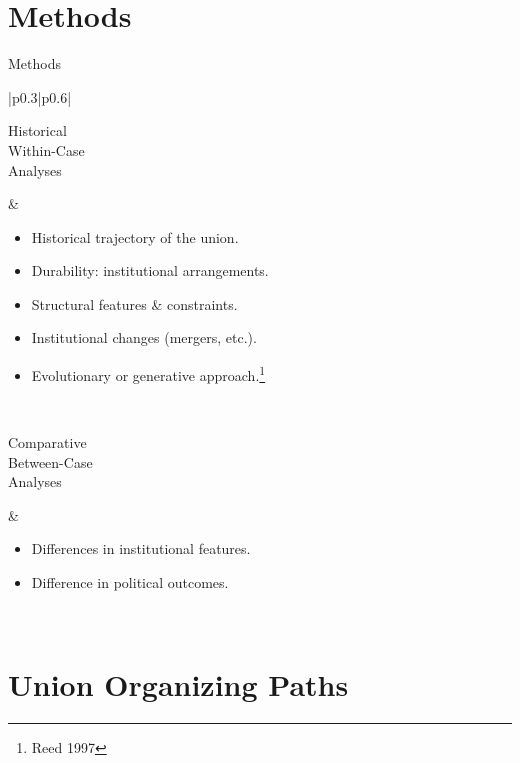 \documentclass{beamer}
\begin{document}
\section{Methods}
\begin{frame}{Methods}
\setlength{\arrayrulewidth}{0.0pt} %
\begin{tabular}{|p{0.3\textwidth}|p{0.6\textwidth}|}
\hline
\begin{minipage}[t][0.2\textheight][t]{\linewidth}
Historical\\
Within-Case\\
Analyses
\end{minipage}
&
\begin{itemize}
    \item Historical trajectory of the union.
    \item Durability: institutional arrangements.
    \item Structural features \& constraints.
    \item Institutional changes (mergers, etc.).
    \item Evolutionary or generative approach.\footnote{Reed 1997}
\end{itemize}
\\
\hline
\begin{minipage}[c][0.2\textheight][b]{\linewidth}
Comparative\\
Between-Case\\
Analyses
\end{minipage}
&
\begin{itemize}
    \item Differences in institutional features.
    \item Difference in political outcomes.
\end{itemize}
\\
\hline
\end{tabular}
\end{frame}

\section{Union Organizing Paths}
\end{document}
